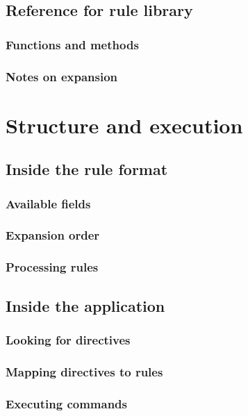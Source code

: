 \documentclass[a4paper,twoside,12pt]{memoir}
\begin{document}
\chapter{Reference for rule library}
\section{Functions and methods}
\section{Notes on expansion}

\part{Structure and execution}

\chapter{Inside the rule format}
\section{Available fields}
\section{Expansion order}
\section{Processing rules}

\chapter{Inside the application}
\section{Looking for directives}
\section{Mapping directives to rules}
\section{Executing commands}
\end{document}
